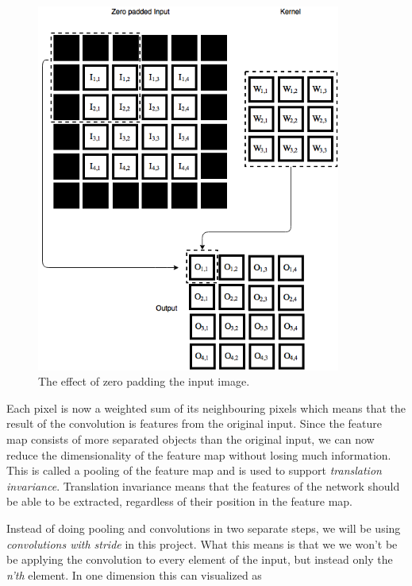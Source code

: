 \documentclass[11pt]{article}
\begin{document}
\begin{figure}[!h]\label{con2}
    \centering
    \includegraphics[width=10cm]{include/conv_2_zero_pad.png}
    \caption{The effect of zero padding the input image.}
    \label{fig:conv}
\end{figure}

Each pixel is now a weighted sum of its neighbouring pixels
which means that the result of the convolution is features from
the original input.
Since the feature map consists of more separated objects than the original input,
we can now reduce the dimensionality of the feature map without losing much information.
This is called a pooling of the feature map and is used to support \textit{translation invariance}.
Translation invariance means that the features of the network should be able to
be extracted, regardless of their position in the feature map.

Instead of doing pooling and convolutions in two separate steps, we will be using 
\textit{convolutions with stride} in this project.
What this means is that we we won't be be applying the convolution to 
every element of the input, but instead only the \textit{n'th} element.
In one dimension this can visualized as
\end{document}
